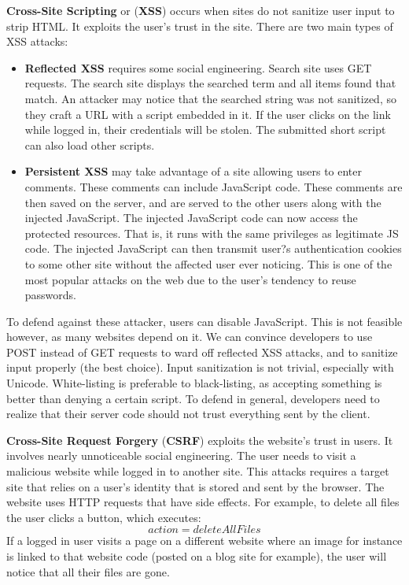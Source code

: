 \documentclass[11pt]{article}
\theoremstyle{plain} %
\theoremstyle{definition}
\theoremstyle{example}
\theoremstyle{remark}
\begin{document}
\textbf{Cross-Site Scripting} or (\textbf{XSS}) occurs when sites do not sanitize user input to strip HTML. It exploits the user's trust in the site. There are two main types of XSS attacks:
\begin{itemize}
	\item \textbf{Reflected XSS} requires some social engineering. Search site uses GET requests. The search site displays the searched term and all items found that match. An attacker may notice that the searched string was not sanitized, so they craft a URL with a script embedded in it. If the user clicks on the link while logged in, their credentials will be stolen. 
The submitted short script can also load other scripts. 
	\item \textbf{Persistent XSS} may take advantage of a site allowing users to enter comments. These comments can include JavaScript code. These comments are then saved on the server, and are served to the other users along with the injected JavaScript. The injected JavaScript code can now access the protected resources. That is, it runs with the same privileges as legitimate JS code. The injected JavaScript can then transmit user?s authentication cookies to some other site without the affected user ever noticing. This is one of the most popular attacks on the web due to the user's tendency to reuse passwords. 
\end{itemize}

To defend against these attacker, users can disable JavaScript. This is not feasible however, as many websites depend on it. We can convince developers to use POST instead of GET requests to ward off reflected XSS attacks, and to sanitize input properly (the best choice). Input sanitization is not trivial, especially with Unicode. White-listing is preferable to black-listing, as accepting something is better than denying a certain script. To defend in general, developers need to realize that their server code should not trust everything sent by the client. 

\textbf{Cross-Site Request Forgery} (\textbf{CSRF}) exploits the website's trust in users. It involves nearly unnoticeable social engineering. The user needs to visit a malicious website while logged in to another site. This attacks requires a target site that relies on a user's identity that is stored and sent by the browser. The website uses HTTP requests that have side effects. For example, to delete all files the user clicks a button, which executes:
$$action=deleteAllFiles$$
If a logged in user visits a page on a different website where an image for instance is linked to that website code (posted on a blog site for example), the user will notice that all their files are gone. 
\end{document}
